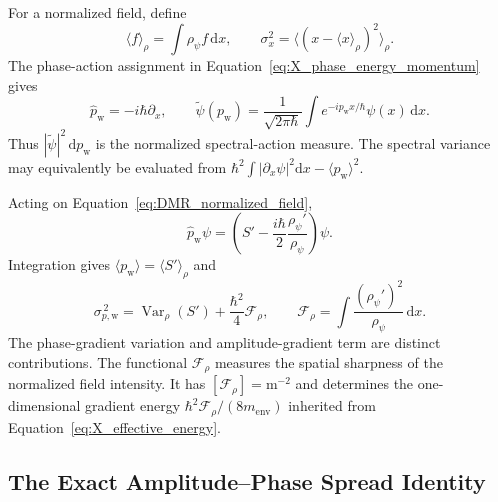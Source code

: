 For a normalized field, define
\begin{equation}
 \langle f\rangle_\rho=\int\rho_\psi f\,\mathrm dx,
 \qquad
 \sigma_x^2=\langle(x-\langle x\rangle_\rho)^2\rangle_\rho.
\label{eq:DMR_field_average}
\end{equation}
The phase-action assignment in Equation~\eqref{eq:X_phase_energy_momentum} gives
\begin{equation}
 \widehat p_{\mathrm w}=-i\hbar\partial_x,
 \qquad
 \widetilde\psi(p_{\mathrm w})=
 \frac{1}{\sqrt{2\pi\hbar}}
 \int e^{-ip_{\mathrm w}x/\hbar}\psi(x)\,\mathrm dx.
\label{eq:DMR_fourier_momentum}
\end{equation}
Thus $|\widetilde\psi|^2\,\mathrm dp_{\mathrm w}$ is the normalized spectral-action measure. The spectral variance may equivalently be evaluated from $\hbar^2\int|\partial_x\psi|^2\mathrm dx-\langle p_{\mathrm w}\rangle^2$.

Acting on Equation~\eqref{eq:DMR_normalized_field},
\begin{equation}
 \widehat p_{\mathrm w}\psi=
 \left(S'-\frac{i\hbar}{2}\frac{\rho_\psi'}{\rho_\psi}\right)\psi.
\label{eq:DMR_momentum_decomposition}
\end{equation}
Integration gives $\langle p_{\mathrm w}\rangle=\langle S'\rangle_\rho$ and
\begin{equation}
 \boxed{
 \sigma_{p,\mathrm w}^{\,2}
 =\operatorname{Var}_\rho(S')+\frac{\hbar^2}{4}\mathcal F_\rho,
 \qquad
 \mathcal F_\rho=\int\frac{(\rho_\psi')^2}{\rho_\psi}\,\mathrm dx
 }.
\label{eq:DMR_momentum_variance}
\end{equation}
The phase-gradient variation and amplitude-gradient term are distinct contributions. The functional $\mathcal F_\rho$ measures the spatial sharpness of the normalized field intensity. It has $[\mathcal F_\rho]=\mathrm{m^{-2}}$ and determines the one-dimensional gradient energy $\hbar^2\mathcal F_\rho/(8m_{\mathrm{env}})$ inherited from Equation~\eqref{eq:X_effective_energy}.

\subsection{The Exact Amplitude--Phase Spread Identity}

